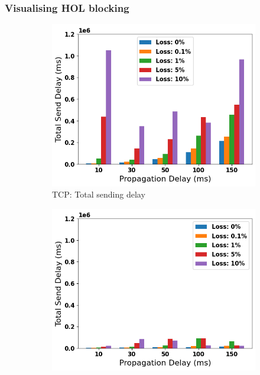 \documentclass{mpaper}
\begin{document}
\subsubsection{Visualising HOL blocking} \label{Visualising HOL blocking}

\begin{figure}
  \centering
  \begin{subfigure}[b]{0.32\textwidth}
      \centering
      \includegraphics[width=\textwidth]{Total_Send/TCP/TCP_Total_Send_delay.png}
      \caption{TCP: Total sending delay}
      \label{fig:TCP_SEND}
  \end{subfigure}
  \hfill
  \begin{subfigure}[b]{0.32\textwidth}
      \centering
      \includegraphics[width=\textwidth]{Total_Send/QUIC_SS/QUIC_SS_Total_Send_delay.png}

\end{subfigure}
\end{figure}
\end{document}
